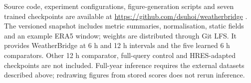 Source code, experiment configurations, figure-generation scripts and
seven trained checkpoints are available at
\url{https://github.com/dsuhoi/weatherbridge}
\cite{sukhorukov2026weatherbridgecode}.
The versioned snapshot includes metric summaries, normalisation, static
fields and an example ERA5 window; weights are distributed through Git LFS.
It provides WeatherBridge at 6 h and 12 h intervals and the five learned
6 h comparators. Other 12 h comparator, full-query control and HRES-adapted
checkpoints are not included.
Full-year inference requires the external datasets described above;
redrawing figures from stored scores does not rerun inference.
